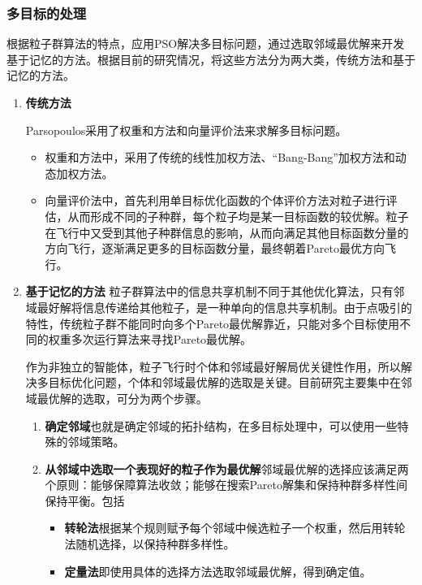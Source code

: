 \subsubsection{多目标的处理}
根据粒子群算法的特点，应用PSO解决多目标问题，通过选取邻域最优解来开发基于记忆的方法。根据目前的研究情况，将这些方法分为两大类，传统方法和基于记忆的方法。
\begin{enumerate}
	\item \textbf{传统方法}
	
	Parsopoulos采用了权重和方法和向量评价法来求解多目标问题。
	\begin{itemize}
		\item 权重和方法中，采用了传统的线性加权方法、“Bang-Bang”加权方法和动态加权方法。
		\item 向量评价法中，首先利用单目标优化函数的个体评价方法对粒子进行评估，从而形成不同的子种群，每个粒子均是某一目标函数的较优解。粒子在飞行中又受到其他子种群信息的影响，从而向满足其他目标函数分量的方向飞行，逐渐满足更多的目标函数分量，最终朝着Pareto最优方向飞行。
	\end{itemize}
	\item \textbf{基于记忆的方法}
	粒子群算法中的信息共享机制不同于其他优化算法，只有邻域最好解将信息传递给其他粒子，是一种单向的信息共享机制。由于点吸引的特性，传统粒子群不能同时向多个Pareto最优解靠近，只能对多个目标使用不同的权重多次运行算法来寻找Pareto最优解。
	
	作为非独立的智能体，粒子飞行时个体和邻域最好解局优关键性作用，所以解决多目标优化问题，个体和邻域最优解的选取是关键。目前研究主要集中在邻域最优解的选取，可分为两个步骤。
	
	\begin{enumerate}
		\item \textbf{确定邻域}也就是确定邻域的拓扑结构，在多目标处理中，可以使用一些特殊的邻域策略。
		\item \textbf{从邻域中选取一个表现好的粒子作为最优解}邻域最优解的选择应该满足两个原则：能够保障算法收敛；能够在搜索Pareto解集和保持种群多样性间保持平衡。包括
		\begin{itemize}
			\item \textbf{转轮法}根据某个规则赋予每个邻域中候选粒子一个权重，然后用转轮法随机选择，以保持种群多样性。
			\item \textbf{定量法}即使用具体的选择方法选取邻域最优解，得到确定值。
		\end{itemize}
	\end{enumerate}
	
\end{enumerate}

